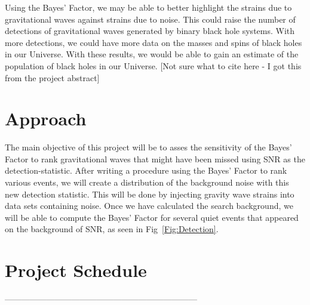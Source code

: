 \documentclass{article}
\begin{document}
 Using the Bayes' Factor, we may be able to better highlight the strains due to gravitational waves against strains due to noise. This could raise the number of detections of gravitational waves generated by binary black hole systems. With more detections, we could have more data on the masses and spins of black holes in our Universe. With these results, we would be able to gain an estimate of the population of black holes in our Universe. [Not sure what to cite here - I got this from the project abstract]
 
 
 \section{Approach}
 The main objective of this project will be to asses the sensitivity of the Bayes' Factor to rank gravitational waves that might have been missed using SNR as the detection-statistic. After writing a procedure using the Bayes' Factor to rank various events, we will create a distribution of the background noise with this new detection statistic. This will be done by injecting gravity wave strains into data sets containing noise. Once we have calculated the search background, we will be able to compute the Bayes' Factor for several quiet events that appeared on the background of SNR, as seen in Fig~\ref{Fig:Detection}.
 
 
 
 
 
 \section{Project Schedule}
 
 
---------------------------------------------------------------------
 
 
 
 
\end{document}
